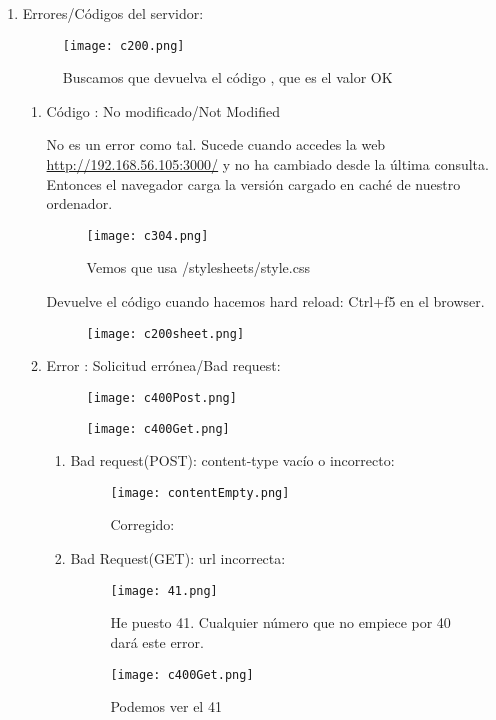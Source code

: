 \begin{enumerate}
	\item Errores/Códigos del servidor:
	\begin{figure}[H]
		\centering
		\texttt{[image: c200.png]}
		\caption{Buscamos que devuelva el código , que es el valor OK}
	\end{figure}
	\begin{enumerate}
		\item Código : No modificado/Not Modified
		
		No es un error como tal. Sucede cuando accedes la web \url{http://192.168.56.105:3000/} y no ha cambiado desde la última consulta. Entonces el navegador carga la versión cargado en caché de nuestro ordenador.
		\begin{figure}[H]
			\centering
			\texttt{[image: c304.png]}
			\caption{Vemos que usa /stylesheets/style.css}
		\end{figure}
		Devuelve el código  cuando hacemos hard reload: Ctrl+f5 en el browser.
		\begin{figure}[H]
			\centering
			\texttt{[image: c200sheet.png]}
		\end{figure}
	
		\item Error : Solicitud errónea/Bad request:
		\begin{figure}[H]
			\centering
			\texttt{[image: c400Post.png]}
		\end{figure}
		\begin{figure}[H]
			\centering
			\texttt{[image: c400Get.png]}
		\end{figure}
		\begin{enumerate}
			\item Bad request(POST): content-type vacío o incorrecto:
				\begin{figure}[H]
				\centering
				\texttt{[image: contentEmpty.png]}
				\caption{Corregido: }
			\end{figure}
		
			\item Bad Request(GET): url incorrecta:
			\begin{figure}[H]
				\centering
				\texttt{[image: 41.png]}
				\caption{He puesto 41. Cualquier número que no empiece por 40 dará este error. }
			\end{figure}
			\begin{figure}[H]
				\centering
				\texttt{[image: c400Get.png]}
				\caption{Podemos ver el 41}
			\end{figure}
		

\end{enumerate}
\end{enumerate}
\end{enumerate}
